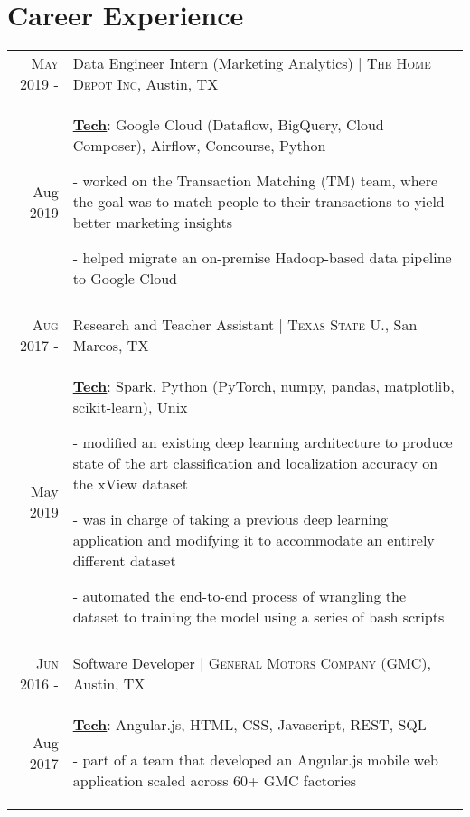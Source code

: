 \documentclass[a4paper,10pt]{article}
\begin{document}
\section{Career Experience}
\begin{tabular}{r|p{12cm}}

\textsc{May 2019 -} & Data Engineer Intern (Marketing Analytics) | \textsc{The Home Depot Inc}, Austin, TX \\
Aug 2019 & \small{
	\textbf{\underline{Tech}}: Google Cloud (Dataflow, BigQuery, Cloud Composer), Airflow, Concourse, Python}

	\tiny{
	\vphantom{a}
	}
	
	\small{
	- worked on the Transaction Matching (TM) team, where the goal was to match people to their transactions to yield better marketing insights
	
	- helped migrate an on-premise Hadoop-based data pipeline to Google Cloud } \\
 \multicolumn{2}{c}{} \\

\textsc{Aug 2017 -} & Research and Teacher Assistant | \textsc{Texas State U.}, San Marcos, TX \\
May 2019 & \small{
	\textbf{\underline{Tech}}: Spark, Python (PyTorch, numpy, pandas, matplotlib, scikit-learn), Unix
	}

	\tiny{
	\vphantom{a}
	}

	\small{
	
	- modified an existing deep learning architecture to produce state of the art classification and localization accuracy on the xView dataset
	
	- was in charge of taking a previous deep learning application and modifying it to accommodate an entirely different dataset 
	
	- automated the end-to-end process of wrangling the dataset to training the model using a series of bash scripts
	}
	\\
 \multicolumn{2}{c}{} \\
 
 \textsc{Jun 2016 -} & Software Developer | \textsc{General Motors Company (GMC)}, Austin, TX \\
Aug 2017 & \small{
	\textbf{\underline{Tech}}: Angular.js, HTML, CSS, Javascript, REST, SQL}

	\tiny{
	\vphantom{a}
	}
	
	\small{
	- part of a team that developed an Angular.js mobile web application scaled across 60+ GMC factories 
	
}
\end{tabular}
\end{document}
